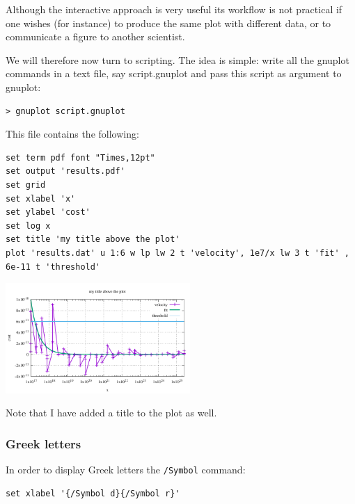 Although the interactive approach is very useful its workflow 
is not practical if one wishes (for instance) to produce the same plot 
with different data, or to communicate a figure to another scientist. 

We will therefore now turn to scripting. The idea is simple: 
write all the gnuplot commands in a text file, say {\filenamefont script.gnuplot} 
and pass this script as argument to gnuplot:
\begin{mdframed}[backgroundcolor=gray!10]
\begin{verbatim}
> gnuplot script.gnuplot 
\end{verbatim}
\end{mdframed}
This file contains the following:
\begin{verbatim}
set term pdf font "Times,12pt"
set output 'results.pdf'
set grid
set xlabel 'x'
set ylabel 'cost'
set log x
set title 'my title above the plot'
plot 'results.dat' u 1:6 w lp lw 2 t 'velocity', 1e7/x lw 3 t 'fit' , 6e-11 t 'threshold'
\end{verbatim}

\begin{center}
\includegraphics[width=7cm]{images/gnuplot/results.pdf}
\end{center}
Note that I have added a title to the plot as well. 



\subsubsection*{Greek letters}

In order to display Greek letters the {\tt /Symbol} command:

\begin{verbatim}
set xlabel '{/Symbol d}{/Symbol r}' 
\end{verbatim}

